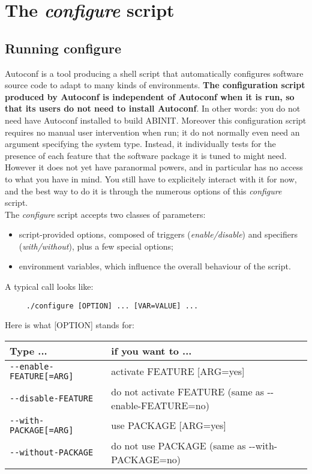 \chapter{The \textit{configure} script}

\section{Running configure}

Autoconf is a tool producing a shell script that automatically
configures software source code to adapt to many kinds of environments.
\textbf{The configuration script produced by Autoconf is independent
of Autoconf when it is run, so that its users do not need to install
Autoconf}. In other words: you do not need have Autoconf installed
to build ABINIT.
Moreover this configuration script requires no
manual user intervention when run; it do not normally even need an
argument specifying the system type. Instead, it individually tests
for the presence of each feature that the software package it is tuned
to might need.
However it does not yet have paranormal powers, and in particular has
no access to what you have in mind. You still have to explicitely
interact with it for now, and the best way to do it is through the
numerous options of this \textit{configure} script.
\\

The \textit{configure} script accepts two classes of parameters:

\begin{itemize}
\item
script-provided options, composed of triggers (\textit{enable/disable})
and specifiers (\textit{with/without}), plus a few special options;
\item
environment variables, which influence the overall behaviour of the
script.
\end{itemize}

A typical call looks like:

\begin{verbatim}
     ./configure [OPTION] ... [VAR=VALUE] ...
\end{verbatim}

Here is what [OPTION] stands for:

\begin{center}
\begin{tabular}{|l|p{7cm}|}
\hline
\textbf{Type ...} & \textbf{if you want to ...} \\
\hline
\texttt{-{-}enable-FEATURE[=ARG]} & activate FEATURE [ARG=yes] \\
\texttt{-{-}disable-FEATURE}      & do not activate FEATURE
                                  (same as \hbox{-{-}enable-FEATURE}=no) \\
\hline
\texttt{-{-}with-PACKAGE[=ARG]}   & use PACKAGE [ARG=yes] \\
\texttt{-{-}without-PACKAGE}      & do not use PACKAGE (same as
                                  \hbox{-{-}with-PACKAGE}=no) \\
\hline
\end{tabular}
\end{center}

